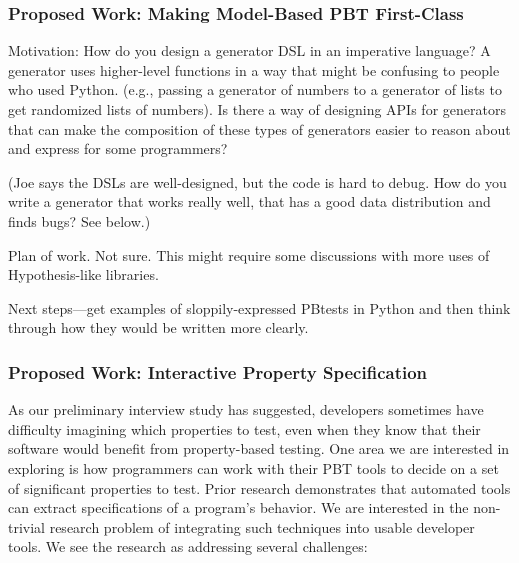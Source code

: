 \subsubsection{Proposed Work: Making Model-Based PBT First-Class}

Motivation: How do you design a generator DSL in an imperative language? A
generator uses higher-level functions in a way that might be confusing to people
who used Python.  (e.g., passing a generator of numbers to a generator of lists
to get randomized lists of numbers). Is there a way of designing APIs for
generators that can make the composition of these types of generators easier to
reason about and express for some programmers?

(Joe says the DSLs are well-designed, but the code is hard to debug. How do you
write a generator that works really well, that has a good data distribution and
finds bugs? See below.)

Plan of work. Not sure. This might require some discussions with more uses of
Hypothesis-like libraries.

Next steps—get examples of sloppily-expressed PBtests in Python and then think
through how they would be written more clearly.

\subsubsection{Proposed Work: Interactive Property Specification}

 

As our preliminary interview study has suggested, developers sometimes have
difficulty imagining which properties to test, even when they know that their
software would benefit from property-based testing. One area we are interested
in exploring is how programmers can work with their PBT tools to decide on a set
of significant properties to test.  Prior research demonstrates that automated
tools can extract specifications of a program's
behavior\cite{ammons2002mining,le2018deep,claessen2010quickspec}. We are
interested in the non-trivial research problem of integrating such techniques
into usable developer tools. We see the research as addressing several
challenges:

